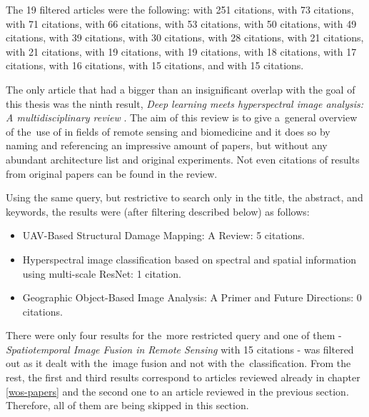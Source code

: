 The 19 filtered articles were the following: \cite{dl-for-cv} with 251 citations, \cite{state-of-the-art-dl} with 73 citations, \cite{review-water-dl} with 71 citations, \cite{review-plant-stress} with 66 citations, \cite{review-text-class} with 53 citations, \cite{review-oil-spill} with 50 citations, \cite{review-cv-infra-inspections} with 49 citations, \cite{review-vessel-detection} with 39 citations, \cite{review-ml-smart-grid} with 30 citations, \cite{review-autonomus-vehicles} with 28 citations, \cite{review-grasp} with 21 citations, \cite{review-3d-human-interaction} with 21 citations, \cite{review-dl-3d-classification} with 19 citations, \cite{review-crop-phenomics} with 19 citations, \cite{review-age-estimation} with 18 citations, \cite{review-shot-boundary} with 17 citations, \cite{review-crop-phenomics-breeding} with 16 citations, \cite{review-video-crowd} with 15 citations, and \cite{review-dl-food} with 15 citations.

The only article that had a bigger than an insignificant overlap with the goal of this thesis was the ninth result, \textit{Deep learning meets hyperspectral image analysis: A multidisciplinary review} \cite{review-dl-hs-rs-bio}. The aim of this review is to give a~general overview of the~use of  in fields of remote sensing and biomedicine and it does so by naming and referencing an impressive amount of papers, but without any abundant architecture list and original experiments. Not even citations of results from original papers can be found in the review.

Using the same query, but restrictive to search only in the title, the abstract, and keywords, the results were (after filtering described below) as follows:

\begin{itemize}
	\item UAV-Based Structural Damage Mapping: A Review: 5 citations. \cite{uav-building-damages}
	\item Hyperspectral image classification based on spectral and spatial information using multi-scale ResNet: 1 citation. \cite{hs-multi-scale-resnet}
	\item Geographic Object-Based Image Analysis: A Primer and Future Directions: 0 citations. \cite{geobia}
\end{itemize}

\noindent There were only four results for the~more restricted query and one of them - \textit{Spatio\-temporal Image Fusion in Remote Sensing} \cite{review-st-fusion} with 15 citations - was filtered out as it dealt with the~image fusion and not with the~classification. From the rest, the first and third results correspond to articles reviewed already in chapter \ref{wos-papers} and the second one to an article reviewed in the previous section. Therefore, all of them are being skipped in this section.
